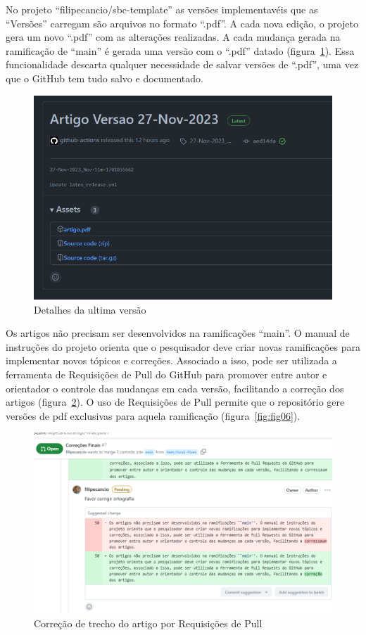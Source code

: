 No projeto ``filipecancio/sbc-template'' as versões implementavéis que as ``Versões'' carregam são arquivos no formato ``.pdf''. A cada nova edição, o projeto gera um novo ``.pdf'' com as alterações realizadas. A cada mudança gerada na ramificação de ``main'' é gerada uma versão com o ``.pdf'' datado (figura~\ref{fig:fig04}). Essa funcionalidade descarta qualquer necessidade de salvar versões de ``.pdf'', uma vez que o GitHub tem tudo salvo e documentado.
\begin{figure}[H]
	\centering
	\includegraphics[width=.6\textwidth]{./images/fig04.png}
	\caption{Detalhes da ultima versão}
	\label{fig:fig04}
\end{figure}

Os artigos não precisam ser desenvolvidos na ramificações ``main''. O manual de instruções do projeto orienta que o pesquisador deve criar novas ramificações para implementar novos tópicos e correções. Associado a isso, pode ser utilizada a ferramenta de Requisições de Pull do GitHub para promover entre autor e orientador o controle das mudanças em cada versão, facilitando a correção dos artigos (figura~\ref{fig:fig05}). O uso de Requisições de Pull permite que o repositório gere versões de pdf exclusivas para aquela ramificação (figura~\ref{fig:fig06}).

\begin{figure}[H]
	\centering
	\includegraphics[width=.6\textwidth]{./images/fig05.png}
	\caption{Correção de trecho do artigo por Requisições de Pull}
	\label{fig:fig05}
\end{figure}

